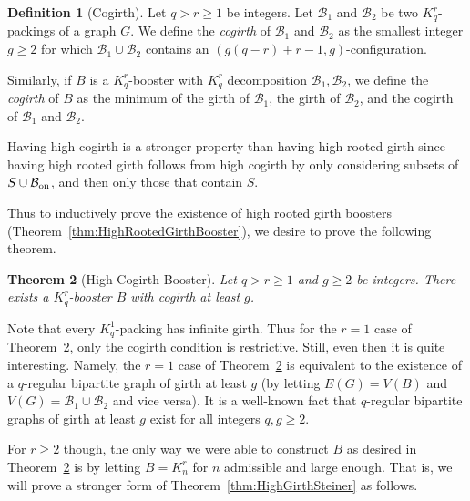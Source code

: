 \documentclass[11pt]{article}
\newcounter{i}
\theoremstyle{plain}
\newtheorem{thm}{Theorem}[section]
\theoremstyle{plain} %
\theoremstyle{definition}
\newtheorem{definition}[thm]{Definition}
\begin{document}
\begin{definition}[Cogirth]\label{def:Cogirth}
Let $q > r\ge 1$ be integers. Let $\mathcal{B}_1$ and $\mathcal{B}_2$ be two $K_q^r$-packings of a graph $G$. We define the \emph{cogirth} of $\mathcal{B}_1$ and $\mathcal{B}_2$ as the smallest integer $g\ge 2$ for which $\mathcal{B}_1\cup \mathcal{B}_2$ contains an $(g(q-r)+r-1,g)$-configuration.

Similarly, if $B$ is a $K_q^r$-booster with $K_q^r$ decomposition $\mathcal{B}_1,\mathcal{B}_2$, we define the \emph{cogirth} of $B$ as the minimum of the girth of $\mathcal{B}_1$, the girth of $\mathcal{B}_2$, and the cogirth of $\mathcal{B}_1$ and $\mathcal{B}_2$.
\end{definition}

Having high cogirth is a stronger property than having high rooted girth since having high rooted girth follows from high cogirth by only considering subsets of $S\cup \mathcal{B}_{{\rm on}}$, and then only those that contain $S$.


Thus to inductively prove the existence of high rooted girth boosters (Theorem~\ref{thm:HighRootedGirthBooster}), we desire to prove the following theorem.

\begin{thm}[High Cogirth Booster]\label{thm:HighCogirthBooster}
Let $q > r\ge 1$ and $g\ge 2$ be integers. There exists a $K_q^r$-booster $B$ with cogirth at least $g$.
\end{thm}

Note that every $K_q^1$-packing has infinite girth. Thus for the $r=1$ case of Theorem~\ref{thm:HighCogirthBooster}, only the cogirth condition is restrictive. Still, even then it is quite interesting. Namely, the $r=1$ case of Theorem~\ref{thm:HighCogirthBooster} is equivalent to the existence of a $q$-regular bipartite graph of girth at least $g$ (by letting $E(G)=V(B)$ and $V(G)=\mathcal{B}_1\cup \mathcal{B}_2$ and vice versa). It is a well-known fact that $q$-regular bipartite graphs of girth at least $g$ exist for all integers $q,g\ge 2$.

For $r\ge 2$ though, the only way we were able to construct $B$ as desired in Theorem~\ref{thm:HighCogirthBooster} is by letting $B=K_n^r$ for $n$ admissible and large enough. That is, we will prove a stronger form of Theorem~\ref{thm:HighGirthSteiner} as follows.
\end{document}
